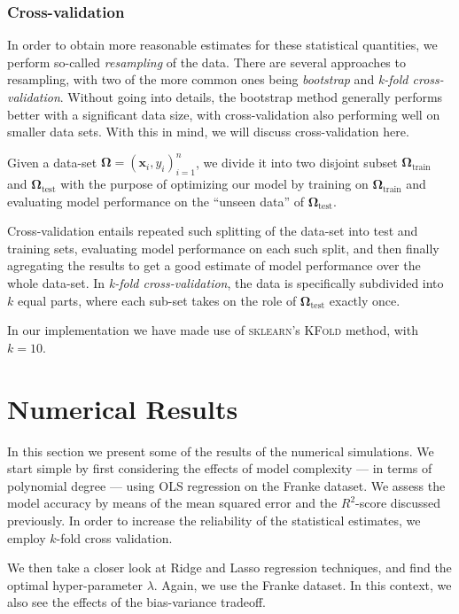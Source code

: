 \documentclass[dvipsnames, article, a4paper, oneside, 12pt]{memoir}
\newcommand{\x}{\bm{x}}
\newcommand{\train}{\mathrm{train}}
\newcommand{\test}{\mathrm{test}}
\newcommand{\data}{\bm{\Omega}}
\begin{document}
  \subsection{Cross-validation}

  In order to obtain more reasonable estimates for these statistical
  quantities, we perform so-called \emph{resampling} of the data. There are
  several approaches to resampling, with two of the more common ones being
  \emph{bootstrap} and \emph{k-fold cross-validation}. Without going into
  details, the bootstrap method generally performs better with a significant
  data size, with cross-validation also performing well on smaller data sets.
  With this in mind, we will discuss cross-validation here.

  Given a data-set \( \data = (\x_i, y_i)_{i=1}^n \), we divide it into two disjoint subset \( \data_\train \) and \( \data_\test \)
  with the purpose of optimizing our model by training on \( \data_\train \) and evaluating model performance on the ``unseen data'' of \( \data_\test \).

  Cross-validation entails repeated such splitting of the data-set into test
  and training sets, evaluating model performance on each such split, and then
  finally agregating the results to get a good estimate of model performance
  over the whole data-set. In \emph{k-fold cross-validation}, the data is
  specifically subdivided into \( k \) equal parts, where each sub-set takes on
  the role of \( \data_\test \) exactly once.
   
  In our implementation we have made use of \textsc{sklearn}'s \textsc{KFold} method, with \( k = 10 \).

  \chapter{Numerical Results}

  In this section we present some of the results of the numerical simulations.
  We start simple by first considering the effects of model complexity --- in
  terms of polynomial degree --- using OLS regression on the Franke dataset. We
  assess the model accuracy by means of the mean squared error and the \(
  R^2\)-score discussed previously. In order to increase the reliability of the
  statistical estimates, we employ \( k\)-fold cross validation.

  We then take a closer look at Ridge and Lasso regression techniques, and find
  the optimal hyper-parameter \( \lambda \). Again, we use the Franke dataset.
  In this context, we also see the effects of the bias-variance tradeoff.
\end{document}
